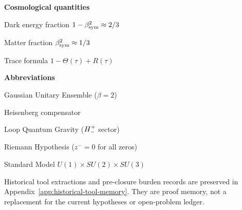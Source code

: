 \begin{minipage}[t]{0.48\textwidth}
\medskip
\noindent\textbf{Cosmological quantities}
\begin{description}[leftmargin=1.8em, labelindent=0pt, itemsep=1pt]
  \item[$\Omega_\Lambda$] Dark energy fraction $1-\beta_{\mathrm{sym}}^2\approx 2/3$
  \item[$\Omega_M$] Matter fraction $\beta_{\mathrm{sym}}^2\approx 1/3$
  \item[$\Sigma(\tau)$] Trace formula $1-\Theta(\tau)+R(\tau)$
\end{description}

\medskip
\noindent\textbf{Abbreviations}
\begin{description}[leftmargin=1.8em, labelindent=0pt, itemsep=1pt]
  \item[GUE] Gaussian Unitary Ensemble ($\beta=2$)
  \item[HC] Heisenberg compensator
  \item[LQG] Loop Quantum Gravity ($H^+_-$ sector)
  \item[RH] Riemann Hypothesis ($z^-=0$ for all zeros)
  \item[SM] Standard Model $U(1)\times SU(2)\times SU(3)$
\end{description}
\end{minipage}


\clearpage

\noindent Historical tool extractions and pre-closure burden records are preserved
in Appendix~\ref{app:historical-tool-memory}. They are proof memory, not a
replacement for the current hypotheses or open-problem ledger.
